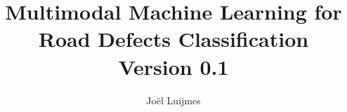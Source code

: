 \documentclass{article}
\begin{document}

\title{
    Multimodal Machine Learning for Road Defects Classification \\
    \small Version 0.1
}
\author{Joël Luijmes}

\maketitle

\tableofcontents










\end{document}
